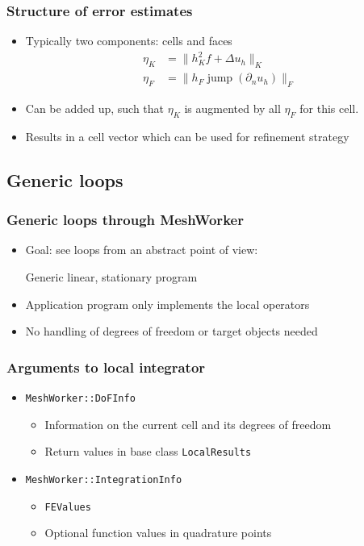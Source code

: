 \begin{frame}
  \frametitle{Structure of error estimates}
  \begin{itemize}
  \item Typically two components: cells and faces
    \begin{align*}
      \eta_K &= \| h_K^2 f+\Delta u_h\|_K \\
      \eta_F &= \| h_F \operatorname{jump}(\partial_n u_h) \|_F
    \end{align*}
  \item Can be added up, such that $\eta_K$ is augmented by all
    $\eta_F$ for this cell.
  \item Results in a cell vector which can be used for refinement
    strategy
  \end{itemize}
\end{frame}

\subsection{Generic loops}

\begin{frame}
  \frametitle{Generic loops through MeshWorker}
  \begin{itemize}
  \item Goal: see loops from an abstract point of view:
      \begin{block}{Generic linear, stationary program}
    
  \end{block}  
  \item Application program only implements the local operators
    \item No handling of degrees of freedom or target objects needed
  \end{itemize}
\end{frame}

\begin{frame}
  \frametitle{Arguments to local integrator}
  \begin{itemize}
  \item\texttt{MeshWorker::DoFInfo}
    \begin{itemize}
    \item Information on the current cell and its degrees of freedom
    \item Return values in base class \texttt{LocalResults}
    \end{itemize}
  \item\texttt{MeshWorker::IntegrationInfo}
    \begin{itemize}
    \item \texttt{FEValues}
    \item Optional function values in quadrature points
    \end{itemize}
  \end{itemize}
\end{frame}


